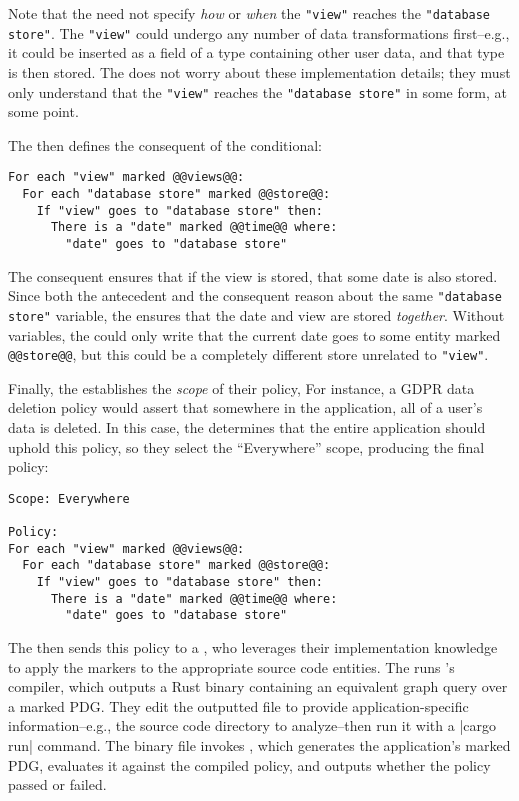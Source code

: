 Note that the \ce{} need not specify \emph{how} or \emph{when} the \lstinline[language=CNL]|"view"| reaches the \lstinline[language=CNL]|"database store"|.
%
The \lstinline[language=CNL]|"view"| could undergo any number of data transformations first--e.g., it could be inserted as a field of a type containing other user data,
and that type is then stored.
%
The \ce{} does not worry about these implementation details; they must only understand that the \lstinline[language=CNL]|"view"| reaches the \lstinline[language=CNL]|"database store"|
in some form, at some point.
%

The \ce{} then defines the consequent of the conditional:
\begin{lstlisting}[language=CNL]
For each "view" marked @@views@@:
  For each "database store" marked @@store@@:
    If "view" goes to "database store" then:
      There is a "date" marked @@time@@ where:
        "date" goes to "database store"
\end{lstlisting}
%
%
%
The consequent ensures that if the view is stored, that some date is also stored.
%
Since both the antecedent and the consequent reason about the same \lstinline[language=CNL]|"database store"| variable,
the \ce{} ensures that the date and view are stored \emph{together}.
%
Without variables, the \ce{} could only write that the current date goes to some entity marked \lstinline[language=CNL]|@@store@@|,
but this could be a completely different store unrelated to \lstinline[language=CNL]|"view"|.

Finally, the \ce{} establishes the \emph{scope} of their policy,
%
For instance, a GDPR data deletion policy would assert that somewhere in the application, 
all of a user's data is deleted.
%
In this case, the \ce{} determines that the entire application should uphold this policy, so they select the ``Everywhere'' scope,
producing the final policy:

\begin{lstlisting}[language=CNL]
Scope: Everywhere

Policy:
For each "view" marked @@views@@:
  For each "database store" marked @@store@@:
    If "view" goes to "database store" then:
      There is a "date" marked @@time@@ where:
        "date" goes to "database store"
\end{lstlisting}

The \ce{} then sends this policy to a \dev{}, 
who leverages their implementation knowledge to apply the markers to the appropriate source code entities.
%
The \dev{} runs \syslang{}'s compiler, which outputs a Rust binary containing an equivalent graph query over a marked PDG.
%
They edit the outputted file to provide application-specific information--e.g., the source code directory to analyze--then run it with a |cargo run| command.
%
The binary file invokes \sys{}, which generates the application's marked PDG, 
evaluates it against the compiled policy,
and outputs whether the policy passed or failed.
%
